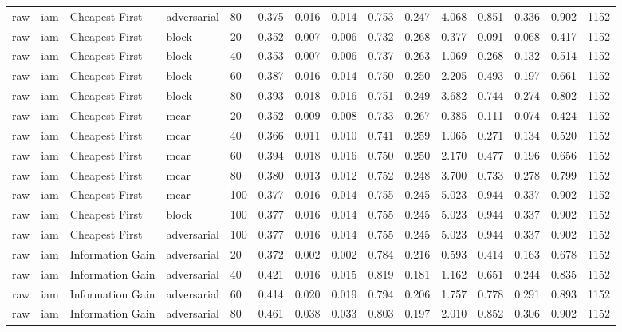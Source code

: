 \begin{table}[!ht]
{\begin{tabular}{lllllllllllllll}
raw & iam & Cheapest First & adversarial & 80 & 0.375 & 0.016 & 0.014 & 0.753 & 0.247 & 4.068 & 0.851 & 0.336 & 0.902 & 1152 \\
raw & iam & Cheapest First & block & 20 & 0.352 & 0.007 & 0.006 & 0.732 & 0.268 & 0.377 & 0.091 & 0.068 & 0.417 & 1152 \\
raw & iam & Cheapest First & block & 40 & 0.353 & 0.007 & 0.006 & 0.737 & 0.263 & 1.069 & 0.268 & 0.132 & 0.514 & 1152 \\
raw & iam & Cheapest First & block & 60 & 0.387 & 0.016 & 0.014 & 0.750 & 0.250 & 2.205 & 0.493 & 0.197 & 0.661 & 1152 \\
raw & iam & Cheapest First & block & 80 & 0.393 & 0.018 & 0.016 & 0.751 & 0.249 & 3.682 & 0.744 & 0.274 & 0.802 & 1152 \\
raw & iam & Cheapest First & mcar & 20 & 0.352 & 0.009 & 0.008 & 0.733 & 0.267 & 0.385 & 0.111 & 0.074 & 0.424 & 1152 \\
raw & iam & Cheapest First & mcar & 40 & 0.366 & 0.011 & 0.010 & 0.741 & 0.259 & 1.065 & 0.271 & 0.134 & 0.520 & 1152 \\
raw & iam & Cheapest First & mcar & 60 & 0.394 & 0.018 & 0.016 & 0.750 & 0.250 & 2.170 & 0.477 & 0.196 & 0.656 & 1152 \\
raw & iam & Cheapest First & mcar & 80 & 0.380 & 0.013 & 0.012 & 0.752 & 0.248 & 3.700 & 0.733 & 0.278 & 0.799 & 1152 \\
raw & iam & Cheapest First & mcar & 100 & 0.377 & 0.016 & 0.014 & 0.755 & 0.245 & 5.023 & 0.944 & 0.337 & 0.902 & 1152 \\
raw & iam & Cheapest First & block & 100 & 0.377 & 0.016 & 0.014 & 0.755 & 0.245 & 5.023 & 0.944 & 0.337 & 0.902 & 1152 \\
raw & iam & Cheapest First & adversarial & 100 & 0.377 & 0.016 & 0.014 & 0.755 & 0.245 & 5.023 & 0.944 & 0.337 & 0.902 & 1152 \\
raw & iam & Information Gain & adversarial & 20 & 0.372 & 0.002 & 0.002 & 0.784 & 0.216 & 0.593 & 0.414 & 0.163 & 0.678 & 1152 \\
raw & iam & Information Gain & adversarial & 40 & 0.421 & 0.016 & 0.015 & 0.819 & 0.181 & 1.162 & 0.651 & 0.244 & 0.835 & 1152 \\
raw & iam & Information Gain & adversarial & 60 & 0.414 & 0.020 & 0.019 & 0.794 & 0.206 & 1.757 & 0.778 & 0.291 & 0.893 & 1152 \\
raw & iam & Information Gain & adversarial & 80 & 0.461 & 0.038 & 0.033 & 0.803 & 0.197 & 2.010 & 0.852 & 0.306 & 0.902 & 1152 \\

\end{tabular}}
\end{table}
